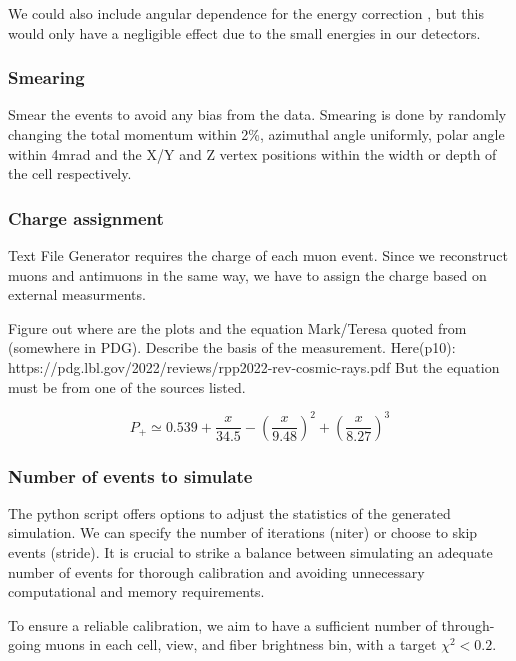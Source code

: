 \documentclass[12pt]{article}
\begin{document}
We could also include angular dependence for the energy correction \cite{rpp2022-rev-cosmic-rays.pdf}, but this would only have a negligible effect due to the small energies  in our detectors.

\subsubsection{Smearing}
Smear the events to avoid any bias from the data. Smearing is done by randomly changing the total momentum within 2\%, azimuthal angle uniformly, polar angle within 4mrad and the X/Y and Z vertex positions within the width or depth of the cell respectively.

\subsubsection{Charge assignment}
Text File Generator requires the charge of each muon event. Since we reconstruct muons and antimuons in the same way, we have to assign the charge based on external measurments.

Figure out where are the plots and the equation Mark/Teresa quoted from (somewhere in PDG). Describe the basis of the measurement.
Here(p10): https://pdg.lbl.gov/2022/reviews/rpp2022-rev-cosmic-rays.pdf
But the equation must be from one of the sources listed.

\begin{equation}
P_+ \simeq 0.539 + \frac{x}{34.5}-\left(\frac{x}{9.48}\right)^2 + \left(\frac{x}{8.27}\right)^3
\end{equation}

\subsubsection{Number of events to simulate}\label{secNumEvents}
The python script offers options to adjust the statistics of the generated simulation. We can specify the number of iterations (niter) or choose to skip events (stride). It is crucial to strike a balance between simulating an adequate number of events for thorough calibration and avoiding unnecessary computational and memory requirements.

To ensure a reliable calibration, we aim to have a sufficient number of through-going muons in each cell, view, and fiber brightness bin, with a target $\chi^2<0.2$.
\end{document}
